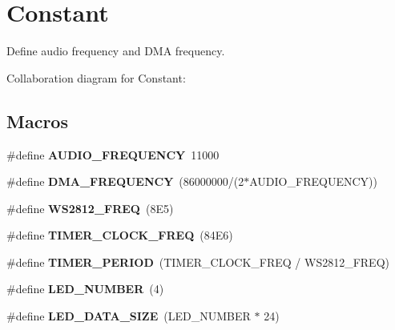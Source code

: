 \hypertarget{group___constant}{}\section{Constant}
\label{group___constant}


Define audio frequency and D\+MA frequency.  


Collaboration diagram for Constant\+:
\subsection*{Macros}
\begin{DoxyCompactItemize}
\item 
\mbox{\label{group___constant_gaae969438a57a86fddf0cf53106c9b6b4}} 
\#define {\bfseries A\+U\+D\+I\+O\+\_\+\+F\+R\+E\+Q\+U\+E\+N\+CY}~11000
\item 
\mbox{\label{group___constant_ga644d7863b10926e5fb77205f294e1964}} 
\#define {\bfseries D\+M\+A\+\_\+\+F\+R\+E\+Q\+U\+E\+N\+CY}~(86000000/(2$\ast$A\+U\+D\+I\+O\+\_\+\+F\+R\+E\+Q\+U\+E\+N\+CY))
\item 
\mbox{\label{group___constant_ga857df980c46f31dbe009560d826413a8}} 
\#define {\bfseries W\+S2812\+\_\+\+F\+R\+EQ}~(8\+E5)
\item 
\mbox{\label{group___constant_ga5f1fac9f0aaabad0683c04e44a1aefe9}} 
\#define {\bfseries T\+I\+M\+E\+R\+\_\+\+C\+L\+O\+C\+K\+\_\+\+F\+R\+EQ}~(84\+E6)
\item 
\mbox{\label{group___constant_gad888acf7c13a4bedd6541ceb5cf9bf6d}} 
\#define {\bfseries T\+I\+M\+E\+R\+\_\+\+P\+E\+R\+I\+OD}~(T\+I\+M\+E\+R\+\_\+\+C\+L\+O\+C\+K\+\_\+\+F\+R\+EQ / W\+S2812\+\_\+\+F\+R\+EQ)
\item 
\mbox{\label{group___constant_ga306db1a2fccc9c26ad114b50a88940d3}} 
\#define {\bfseries L\+E\+D\+\_\+\+N\+U\+M\+B\+ER}~(4)
\item 
\mbox{\label{group___constant_ga7af472c9efcf021651c589bb54d103fa}} 
\#define {\bfseries L\+E\+D\+\_\+\+D\+A\+T\+A\+\_\+\+S\+I\+ZE}~(L\+E\+D\+\_\+\+N\+U\+M\+B\+ER $\ast$ 24)
\item 

\end{DoxyCompactItemize}
